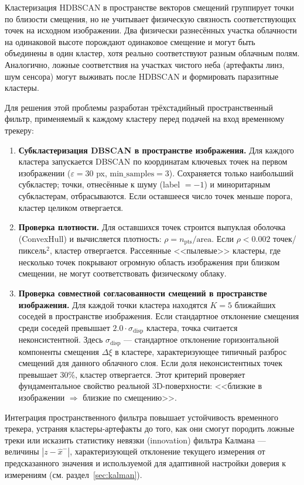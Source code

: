 \documentclass[11pt]{article} %
\begin{document}
	Кластеризация HDBSCAN в пространстве векторов смещений группирует точки по близости смещения, но не учитывает физическую связность соответствующих точек на исходном изображении. Два физически разнесённых участка облачности на одинаковой высоте порождают одинаковое смещение и могут быть объединены в один кластер, хотя реально соответствуют разным облачным полям. Аналогично, ложные соответствия на участках чистого неба (артефакты линз, шум сенсора) могут выживать после HDBSCAN и формировать паразитные кластеры.
	
	Для решения этой проблемы разработан трёхстадийный пространственный фильтр, применяемый к каждому кластеру перед подачей на вход временному трекеру:
	
	\begin{enumerate}
		\item \textbf{Субкластеризация DBSCAN в пространстве изображения.} Для каждого кластера запускается DBSCAN по координатам ключевых точек на первом изображении ($\varepsilon = 30$ px, $\text{min\_samples} = 3$). Сохраняется только наибольший субкластер; точки, отнесённые к шуму (label $=-1$) и миноритарным субкластерам, отбрасываются. Если оставшееся число точек меньше порога, кластер целиком отвергается.
		\item \textbf{Проверка плотности.} Для оставшихся точек строится выпуклая оболочка (ConvexHull) и вычисляется плотность: $\rho = n_\text{pts} / \text{area}$. Если $\rho < 0.002$ точек/пиксель$^2$, кластер отвергается. Рассеянные <<пылевые>> кластеры, где несколько точек покрывают огромную область изображения при близком смещении, не могут соответствовать физическому облаку.
		\item \textbf{Проверка совместной согласованности смещений в пространстве изображения.} Для каждой точки кластера находятся $K = 5$ ближайших соседей в пространстве изображения. Если стандартное отклонение смещения среди соседей превышает $2.0 \cdot \sigma_\text{disp}$ кластера, точка считается неконсистентной. Здесь $\sigma_\text{disp}$ --- стандартное отклонение горизонтальной компоненты смещения $\Delta\xi$ в кластере, характеризующее типичный разброс смещений для данного облачного слоя. Если доля неконсистентных точек превышает 30\%, кластер отвергается. Этот критерий проверяет фундаментальное свойство реальной 3D-поверхности: <<близкие в изображении $\Rightarrow$ близкие по смещению>>.
	\end{enumerate}
	
	Интеграция пространственного фильтра повышает устойчивость временного трекера, устраняя кластеры-артефакты до того, как они смогут породить ложные треки или исказить статистику невязки (innovation) фильтра Калмана --- величины $|z - \hat{x}^-|$, характеризующей отклонение текущего измерения от предсказанного значения и используемой для адаптивной настройки доверия к измерениям (см. раздел~\ref{sec:kalman}).
	
\end{document}
